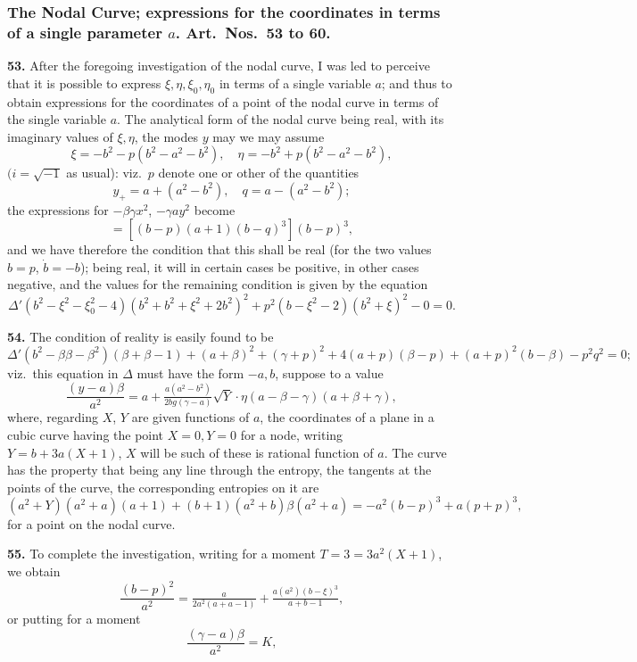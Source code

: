 \documentclass[11pt,a4paper]{article}
\theoremstyle{plain}
\theoremstyle{definition}
\begin{document}
\subsubsection*{The Nodal Curve; expressions for the coordinates in terms of a single parameter $a$. Art.\ Nos.\ 53 to 60.}

\textbf{53.} After the foregoing investigation of the nodal curve, I was led to perceive that it is possible to express $\xi, \eta, \xi_0, \eta_0$ in terms of a single variable $a$; and thus to obtain expressions for the coordinates of a point of the nodal curve in terms of the single variable $a$. The analytical form of the nodal curve being real, with its imaginary values of $\xi, \eta$, the modes $y$ may we may assume
\[
\xi = -b^2 - p(b^2 - a^2 - b^2),\quad \eta = -b^2 + p(b^2 - a^2 - b^2),
\]
$(i = \sqrt{-1}$ as usual): viz.\ $p$ denote one or other of the quantities
\[
y_+ = a + (a^2 - b^2),\quad q = a - (a^2 - b^2);
\]
the expressions for $-\beta\gamma x^2$, $-\gamma a y^2$ become
\[
= [(b - p)(a + 1)(b - q)^3](b - p)^3,
\]
and we have therefore the condition that this shall be real (for the two values $b = p$, $\dot{b} = -b$); being real, it will in certain cases be positive, in other cases negative, and the values for the remaining condition is given by the equation
\[
\Delta'(b^2 - \xi^2 - \xi_0^2 - 4)(b^2 + b^2 + \xi^2 + 2b^2)^2 + p^2(b - \xi^2 - 2)(b^2 + \xi)^2 - 0 = 0.
\]

\textbf{54.} The condition of reality is easily found to be
\[
\Delta'(b^2 - \beta\beta - \beta^2)(\beta + \beta - 1) + (a + \beta)^2 + (\gamma + p)^2 + 4(a + p)(\beta - p) + (a + p)^2(b - \beta) - p^2 q^2 = 0;
\]
viz.\ this equation in $\Delta$ must have the form $-a, b$, suppose to a value
\[
\frac{(y - a)\beta}{a^2} = a + \tfrac{a(a^2 - b^2)}{2bg(\gamma - a)}\sqrt{Y}\cdot\eta(a - \beta - \gamma)(a + \beta + \gamma),
\]
where, regarding $X$, $Y$ are given functions of $a$, the coordinates of a plane in a cubic curve having the point $X = 0, Y = 0$ for a node, writing $Y = b + 3a(X + 1)$, $X$ will be such of these is rational function of $a$. The curve has the property that being any line through the entropy, the tangents at the points of the curve, the corresponding entropies on it are
\[
(a^2 + Y)(a^2 + a)(a + 1) + (b + 1)(a^2 + b)\beta(a^2 + a) = -a^2(b - p)^3 + a(p + p)^3,
\]
for a point on the nodal curve.

\textbf{55.} To complete the investigation, writing for a moment $T = 3 = 3a^2(X + 1)$, we obtain
\[
\frac{(b - p)^2}{a^2} = \tfrac{a}{2a^2(a + a - 1)} + \tfrac{a(a^2)(b - \xi)^3}{a + b - 1},
\]
or putting for a moment
\[
\frac{(\gamma - a)\beta}{a^2} = K,
\]
\end{document}
